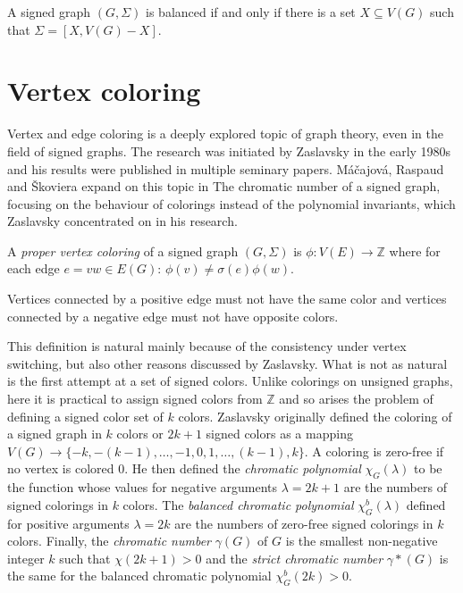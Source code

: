 \begin{theorem}\label{vertex-set-partition}
A signed graph $(G, \Sigma)$ is balanced if and only if there is a set $X \subseteq V(G)$ such that $\Sigma = [X, V(G) - X]$.
\end{theorem}

\section{Vertex coloring}

Vertex and edge coloring is a deeply explored topic of graph theory, even in the field of signed graphs.
The research was initiated by Zaslavsky\cite{zaslavsky-graphs} in the early 1980s and his results were published in multiple seminary papers\cite{zaslavsky-invariants,zaslavsky-coloring,zaslavsky-colorful}.
Máčajová, Raspaud and Škoviera expand on this topic in The chromatic number of a signed graph\cite{chromatic-number},
focusing on the behaviour of colorings instead of the polynomial invariants, which Zaslavsky concentrated on in his research.

A \textit{proper vertex coloring} of a signed graph $(G, \Sigma)$ is 
$\phi : V(E) \rightarrow \mathbb{Z}$
where for each edge $e = vw \in E(G)$: $\phi (v) \neq \sigma (e) \phi (w)$.

Vertices connected by a positive edge must not have the same color and vertices connected by a negative edge must not have opposite colors.

This definition is natural mainly because of the consistency under vertex switching, but also other reasons discussed by Zaslavsky.
What is not as natural is the first attempt at a set of signed colors. 
Unlike colorings on unsigned graphs, here it is practical to assign signed colors from $\mathbb{Z}$ and so arises the problem of defining a signed color set of $k$ colors.
Zaslavsky originally defined the coloring of a signed graph in $k$ colors or $2k+1$ signed colors as 
a mapping $V(G) \rightarrow \{-k, -(k-1), \dots, -1,0,1, \dots , (k-1), k\}$. 
A coloring is zero-free if no vertex is colored 0. He then defined the \textit{chromatic polynomial} $\chi _G (\lambda)$ to be the function
whose values for negative arguments $\lambda = 2k + 1$ are the numbers of signed colorings in $k$ colors. The \textit{balanced chromatic polynomial}
$\chi _G ^b (\lambda)$ defined
for positive arguments $\lambda = 2k$ are the numbers of zero-free signed colorings in $k$ colors.
Finally, the \textit{chromatic number} $\gamma(G)$ of $G$ is the smallest non-negative integer $k$ such that $\chi (2k+1) > 0$ and the \textit{strict chromatic number} $\gamma * (G)$ is the 
same for the balanced chromatic polynomial $\chi _G ^b (2k) > 0$.

